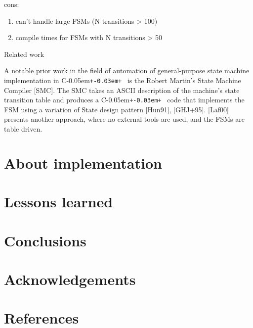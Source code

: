 \documentclass{netobjectdays}
\newcommand{\Cpp}{C\kern-0.05em\texttt{+\kern-0.03em+}%
}
\begin{document}
cons:
\begin{enumerate}
\item can't handle large FSMs (N transitions > 100) 
\item compile times for FSMs with N transitions > 50 
\end{enumerate}


Related work

A notable prior work in the field of automation of general-purpose 
state machine implementation in \Cpp\ is the Robert Martin's State 
Machine Compiler [SMC]. The SMC takes an ASCII description of the 
machine's state transition table and produces a \Cpp\ code that 
implements the FSM using a variation of State design pattern [Hun91],
[GHJ+95]. [Laf00] presents another approach, where no external tools 
are used, and the FSMs are table driven. 


\section{About implementation}

\section{Lessons learned}

\section{Conclusions}
\section{Acknowledgements}
\section{References}

 
\end{document}
